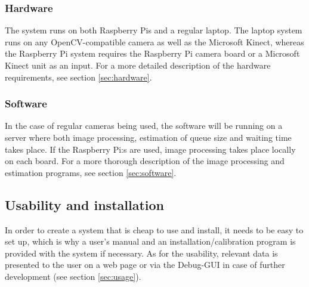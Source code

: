\subsubsection{Hardware}
The system runs on both Raspberry Pis and a regular laptop. The laptop system runs on any OpenCV-compatible camera as well as the Microsoft Kinect, whereas the Raspberry Pi system requires the Raspberry Pi camera board or a Microsoft Kinect unit as an input. For a more detailed description of the hardware requirements, see section \ref{sec:hardware}.

\subsubsection{Software}
In the case of regular cameras being used, the software will be running on a server where both image processing, estimation of queue size and waiting time takes place. If the Raspberry Pi:s are used, image processing takes place locally on each board. For a more thorough description of the image processing and estimation programs, see section \ref{sec:software}.

\subsection{Usability and installation}
In order to create a system that is cheap to use and install, it needs to be easy to set up, which is why a user's manual and an installation/calibration program is provided with the system if necessary. As for the usability, relevant data is presented to the user on a web page or via the Debug-GUI in case of further development (see section \ref{sec:usage}). 


